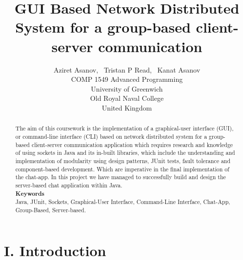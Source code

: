 \documentclass{COMPXXXX}
\begin{document}
\title
{GUI Based Network Distributed System for a group-based client-server communication}

\author
{Aziret Asanov,~
Tristan P Read,~
Kanat Asanov\\
\hspace
    COMP 1549 Advanced Programming\\
	University of Greenwich\\
Old Royal Naval College\\
United Kingdom
        }

\maketitle


\begin{abstract}

\normalsize \textrm {The aim of this coursework is the implementation of a graphical-user interface (GUI), or command-line interface (CLI) based on network distributed system for a group-based client-server communication application which requires research and knowledge of using sockets in Java and its in-built libraries, which include the understanding and implementation of modularity using design patterns, JUnit tests, fault tolerance and component-based development. Which are imperative in the final implementation of the chat-app. In this project we have managed to successfully build and design the server-based chat application within Java.}\\
\textbf{Keywords}\\
\normalsize \textrm {Java, JUnit, Sockets, Graphical-User Interface, Command-Line Interface, Chat-App, Group-Based, Server-based.}

\end{abstract}


\section{I. Introduction}
\end{document}
